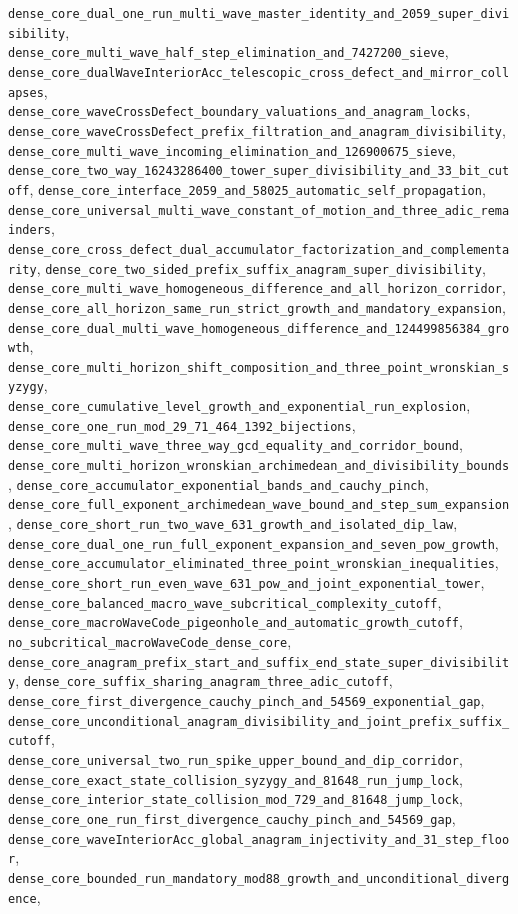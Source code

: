 \documentclass[11pt]{article}
\begin{document}
\begin{enumerate}
\texttt{dense\_core\_dual\_one\_run\_multi\_wave\_master\_identity\_and\_2059\_super\_divisibility}, \texttt{dense\_core\_multi\_wave\_half\_step\_elimination\_and\_7427200\_sieve}, \texttt{dense\_core\_dualWaveInteriorAcc\_telescopic\_cross\_defect\_and\_mirror\_collapses}, \texttt{dense\_core\_waveCrossDefect\_boundary\_valuations\_and\_anagram\_locks}, \texttt{dense\_core\_waveCrossDefect\_prefix\_filtration\_and\_anagram\_divisibility}, \texttt{dense\_core\_multi\_wave\_incoming\_elimination\_and\_126900675\_sieve}, \texttt{dense\_core\_two\_way\_16243286400\_tower\_super\_divisibility\_and\_33\_bit\_cutoff}, \texttt{dense\_core\_interface\_2059\_and\_58025\_automatic\_self\_propagation}, \texttt{dense\_core\_universal\_multi\_wave\_constant\_of\_motion\_and\_three\_adic\_remainders}, \texttt{dense\_core\_cross\_defect\_dual\_accumulator\_factorization\_and\_complementarity}, \texttt{dense\_core\_two\_sided\_prefix\_suffix\_anagram\_super\_divisibility}, \texttt{dense\_core\_multi\_wave\_homogeneous\_difference\_and\_all\_horizon\_corridor}, \texttt{dense\_core\_all\_horizon\_same\_run\_strict\_growth\_and\_mandatory\_expansion}, \texttt{dense\_core\_dual\_multi\_wave\_homogeneous\_difference\_and\_124499856384\_growth}, \texttt{dense\_core\_multi\_horizon\_shift\_composition\_and\_three\_point\_wronskian\_syzygy}, \texttt{dense\_core\_cumulative\_level\_growth\_and\_exponential\_run\_explosion}, \texttt{dense\_core\_one\_run\_mod\_29\_71\_464\_1392\_bijections}, \texttt{dense\_core\_multi\_wave\_three\_way\_gcd\_equality\_and\_corridor\_bound}, \texttt{dense\_core\_multi\_horizon\_wronskian\_archimedean\_and\_divisibility\_bounds}, \texttt{dense\_core\_accumulator\_exponential\_bands\_and\_cauchy\_pinch}, \texttt{dense\_core\_full\_exponent\_archimedean\_wave\_bound\_and\_step\_sum\_expansion}, \texttt{dense\_core\_short\_run\_two\_wave\_631\_growth\_and\_isolated\_dip\_law}, \texttt{dense\_core\_dual\_one\_run\_full\_exponent\_expansion\_and\_seven\_pow\_growth}, \texttt{dense\_core\_accumulator\_eliminated\_three\_point\_wronskian\_inequalities}, \texttt{dense\_core\_short\_run\_even\_wave\_631\_pow\_and\_joint\_exponential\_tower}, \texttt{dense\_core\_balanced\_macro\_wave\_subcritical\_complexity\_cutoff}, \texttt{dense\_core\_macroWaveCode\_pigeonhole\_and\_automatic\_growth\_cutoff}, \texttt{no\_subcritical\_macroWaveCode\_dense\_core}, \texttt{dense\_core\_anagram\_prefix\_start\_and\_suffix\_end\_state\_super\_divisibility}, \texttt{dense\_core\_suffix\_sharing\_anagram\_three\_adic\_cutoff}, \texttt{dense\_core\_first\_divergence\_cauchy\_pinch\_and\_54569\_exponential\_gap}, \texttt{dense\_core\_unconditional\_anagram\_divisibility\_and\_joint\_prefix\_suffix\_cutoff}, \texttt{dense\_core\_universal\_two\_run\_spike\_upper\_bound\_and\_dip\_corridor}, \texttt{dense\_core\_exact\_state\_collision\_syzygy\_and\_81648\_run\_jump\_lock}, \texttt{dense\_core\_interior\_state\_collision\_mod\_729\_and\_81648\_jump\_lock}, \texttt{dense\_core\_one\_run\_first\_divergence\_cauchy\_pinch\_and\_54569\_gap}, \texttt{dense\_core\_waveInteriorAcc\_global\_anagram\_injectivity\_and\_31\_step\_floor}, \texttt{dense\_core\_bounded\_run\_mandatory\_mod88\_growth\_and\_unconditional\_divergence}, 
\end{enumerate}
\end{document}
